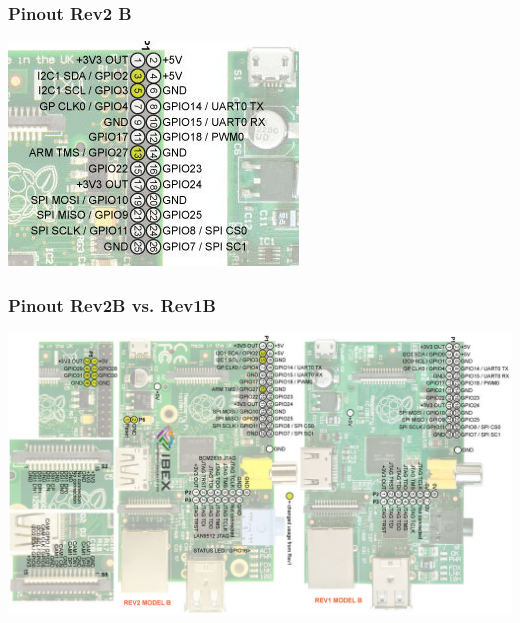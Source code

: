 \documentclass[10pt,colorlinks]{beamer}
\begin{document}
\begin{frame}[plain]\frametitle{Pinout Rev2 B}
\begin{center}
\includegraphics[width=0.9\linewidth]{figs/pinoutsBz}
\end{center}
\end{frame}


\begin{frame}[plain]\frametitle{Pinout Rev2B vs. Rev1B}
\begin{center}
\includegraphics[width=1.1\linewidth]{figs/pinoutsB}
\end{center}
\end{frame}


\end{document}
